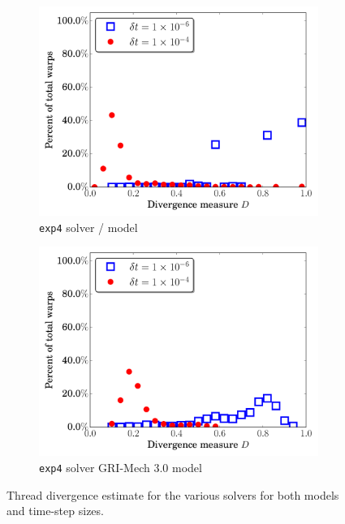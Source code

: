 \documentclass[preprint]{elsarticle}
\begin{document}
\begin{figure}[htb]
\begin{subfigure}{0.49\textwidth}
      \includegraphics[width=\linewidth]{H2_exp4_div.pdf}
      \caption{\texttt{exp4} solver \slash{} model}
      \label{F:exp4_div_h2}
  \end{subfigure}
  \begin{subfigure}{0.49\textwidth}
      \includegraphics[width=\linewidth]{CH4_exp4_div.pdf}
      \caption{\texttt{exp4} solver GRI-Mech 3.0 model}
      \label{F:exp4_div_ch4}
  \end{subfigure}
  \caption{Thread divergence estimate for the various solvers for both models and time-step sizes.}
  \label{F:divergence}
\end{figure}
\begin{figure}[htb]
  \centering
\end{figure}
\end{document}

